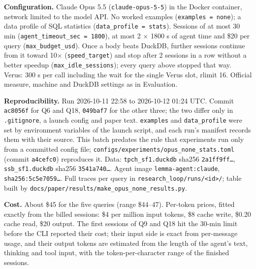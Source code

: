 \documentclass[
]{article}
\newcounter{none} %
\begin{document}
\textbf{Configuration.} Claude Opus 5.5 (\texttt{claude-opus-5-5}) in
the Docker container, network limited to the model API. No worked
examples (\texttt{examples\ =\ none}); a data profile of SQL statistics
(\texttt{data\_profile\ =\ stats}). Sessions of at most 30 min
(\texttt{agent\_timeout\_sec\ =\ 1800}), at most 2 × 1800 s of agent
time and \$20 per query (\texttt{max\_budget\_usd}). Once a body beats
DuckDB, further sessions continue from it toward 10×
(\texttt{speed\_target}) and stop after 2 sessions in a row without a
better speedup (\texttt{max\_idle\_sessions}); every query above stopped
that way. Verus: 300 s per call including the wait for the single Verus
slot, rlimit 16. Official measure, machine and DuckDB settings as in
Evaluation.

\textbf{Reproducibility.} Run 2026-10-11 22:58 to 2026-10-12 01:24 UTC.
Commit \texttt{ac8056f} for Q6 and Q18, \texttt{049baf7} for the other
three; the two differ only in \texttt{.gitignore}, a launch config and
paper text. \texttt{examples} and \texttt{data\_profile} were set by
environment variables of the launch script, and each run's manifest
records them with their source. This batch predates the rule that
experiments run only from a committed config file;
\texttt{configs/experiments/opus\_none\_stats.toml} (commit
\texttt{a4cefc0}) reproduces it. Data: \texttt{tpch\_sf1.duckdb} sha256
\texttt{2a1ff9ff…}, \texttt{ssb\_sf1.duckdb} sha256 \texttt{3541a740…}.
Agent image \texttt{lemma-agent:claude}, \texttt{sha256:5c5e7059…}. Full
traces per query in
\texttt{research\_loop/runs/\textless{}id\textgreater{}/}; table built
by \texttt{docs/paper/results/make\_opus\_none\_results.py}.

\textbf{Cost.} About \$45 for the five queries (range \$44--47).
Per-token prices, fitted exactly from the billed sessions: \$4 per
million input tokens, \$8 cache write, \$0.20 cache read, \$20 output.
The first sessions of Q9 and Q18 hit the 30-min limit before the CLI
reported their cost; their input side is exact from per-message usage,
and their output tokens are estimated from the length of the agent's
text, thinking and tool input, with the token-per-character range of the
finished sessions.
\end{document}
